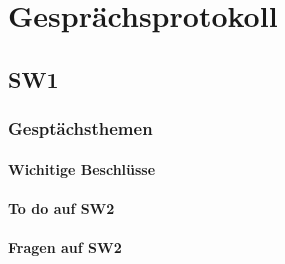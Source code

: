 \documentclass[10pt,a4paper]{report}
\begin{document}
\chapter{Gesprächsprotokoll}

\section{SW1}
\subsection{Gesptächsthemen}
\subsubsection{Wichitige Beschlüsse}
\subsubsection{To do auf SW2}
\subsubsection{Fragen auf SW2}
\end{document}
